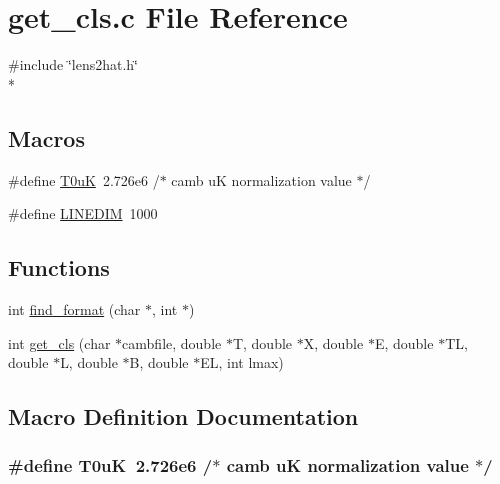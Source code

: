 \section{get\-\_\-cls.\-c File Reference}
\label{rng_2common_2get__cls_8c}
{\ttfamily \#include \char`\"{}lens2hat.\-h\char`\"{}}\\*
\subsection*{Macros}
\begin{DoxyCompactItemize}
\item 
\#define \hyperlink{rng_2common_2get__cls_8c_a08cd9bfd4b050dde02e833f33461b671}{T0u\-K}~2.\-726e6           /$\ast$ camb u\-K normalization value $\ast$/
\item 
\#define \hyperlink{rng_2common_2get__cls_8c_aaa0c0616e8717ea9c76dd7904f655152}{L\-I\-N\-E\-D\-I\-M}~1000
\end{DoxyCompactItemize}
\subsection*{Functions}
\begin{DoxyCompactItemize}
\item 
int \hyperlink{rng_2common_2get__cls_8c_ad0d22c8f81de4958118034489dcf9038}{find\-\_\-format} (char $\ast$, int $\ast$)
\item 
int \hyperlink{rng_2common_2get__cls_8c_adcf8d34c58e37d76212faa5cf10061a8}{get\-\_\-cls} (char $\ast$cambfile, double $\ast$T, double $\ast$X, double $\ast$E, double $\ast$T\-L, double $\ast$L, double $\ast$B, double $\ast$E\-L, int lmax)
\end{DoxyCompactItemize}


\subsection{Macro Definition Documentation}
\subsubsection[{T0u\-K}]{\setlength{\rightskip}{0pt plus 5cm}\#define T0u\-K~2.\-726e6           /$\ast$ camb u\-K normalization value $\ast$/}\label{rng_2common_2get__cls_8c_a08cd9bfd4b050dde02e833f33461b671}


